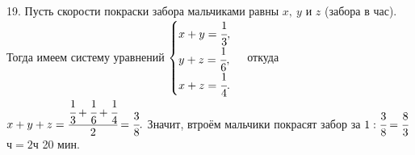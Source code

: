 19. Пусть скорости покраски забора мальчиками равны $x,\ y$ и $z$ (забора в час). Тогда имеем систему уравнений $\begin{cases} x+y=\cfrac{1}{3},\\ y+z=\cfrac{1}{6},\\ x+z=\cfrac{1}{4}.\end{cases}$ откуда $x+y+z=\cfrac{\cfrac{1}{3}+\cfrac{1}{6}+\cfrac{1}{4}}{2}=\cfrac{3}{8}.$ Значит, втроём мальчики покрасят забор за $1:\cfrac{3}{8}=\cfrac{8}{3}$ч$=2$ч 20 мин.\\
